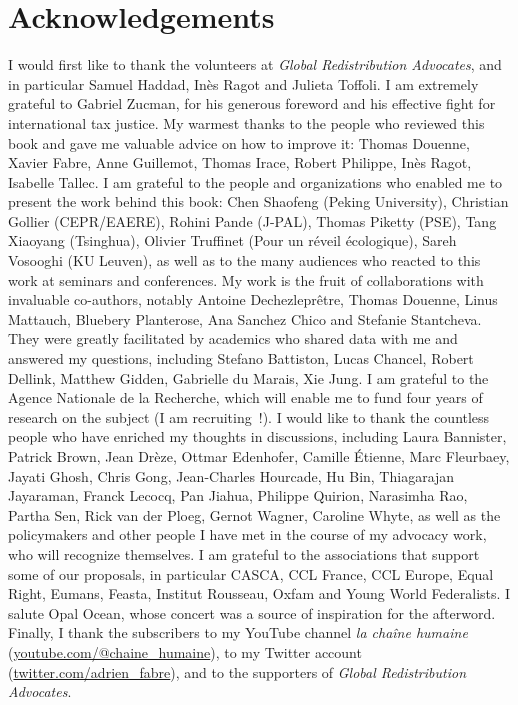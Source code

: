 \documentclass[a5paper,english,openany]{memoir}
\begin{document}
\section*{Acknowledgements}\label{sec:merci} 
I would first like to thank the volunteers at \textit{Global Redistribution Advocates}, and in particular Samuel Haddad, Inès Ragot and Julieta Toffoli. I am extremely grateful to Gabriel Zucman, for his generous foreword and his effective fight for international tax justice. My warmest thanks to the people who reviewed this book and gave me valuable advice on how to improve it: Thomas Douenne, Xavier Fabre, Anne Guillemot, Thomas Irace, Robert Philippe, Inès Ragot, Isabelle Tallec. I am grateful to the people and organizations who enabled me to present the work behind this book: Chen Shaofeng (Peking University), Christian Gollier (CEPR/EAERE), Rohini Pande (J-PAL), Thomas Piketty (PSE), Tang Xiaoyang (Tsinghua), Olivier Truffinet (Pour un réveil écologique), Sareh Vosooghi (KU Leuven), as well as to the many audiences who reacted to this work at seminars and conferences. My work is the fruit of collaborations with invaluable co-authors, notably Antoine Dechezleprêtre, Thomas Douenne, Linus Mattauch, Bluebery Planterose, Ana Sanchez Chico and Stefanie Stantcheva. 
They were greatly facilitated by academics who shared data with me and answered my questions, including Stefano Battiston, Lucas Chancel, Robert Dellink, Matthew Gidden, Gabrielle du Marais, Xie Jung. %
I am grateful to the Agence Nationale de la Recherche, which will enable me to fund four years of research on the subject (I am recruiting~!). 
I would like to thank the countless people who have enriched my thoughts in discussions, including Laura Bannister, Patrick Brown, Jean Drèze, Ottmar Edenhofer, Camille Étienne, Marc Fleurbaey, Jayati Ghosh, Chris Gong, Jean-Charles Hourcade, Hu Bin, Thiagarajan Jayaraman, Franck Lecocq, Pan Jiahua, Philippe Quirion, Narasimha Rao, Partha Sen, Rick van der Ploeg, Gernot Wagner, Caroline Whyte, as well as the policymakers and other people I have met in the course of my advocacy work, who will recognize %
themselves. I am grateful to the associations that support some of our proposals, 
in particular CASCA, CCL France, CCL Europe, Equal Right, Eumans, Feasta, Institut Rousseau, Oxfam and Young World Federalists. I salute Opal Ocean, whose concert was a source of inspiration for the afterword. Finally, I thank the subscribers to my YouTube channel \textit{la chaîne humaine} (\href{https://www.youtube.com/@chaine_humaine}{youtube.com/@chaine\_humaine}), to my Twitter account (\href{https://twitter.com/adrien_fabre}{twitter.com/adrien\_fabre}), and to the supporters of \textit{Global Redistribution Advocates}.


\pagebreak \vspace*{-2cm}
\listoftables \vspace{-1cm}
\listoffigures
\end{document}
